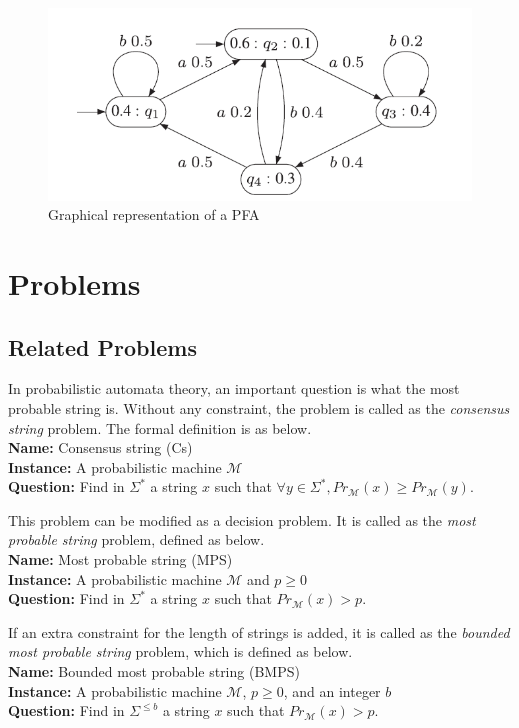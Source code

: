 \documentclass[a4paper]{article}
\begin{document}
\begin{figure}[htbp]
\begin{center}
\includegraphics[scale=0.7]{figure1}
\caption{Graphical representation of a PFA \cite{de2010grammatical}} \label{fig:label}
\end{center}
\end{figure}



\section{Problems}
\subsection{Related Problems}
In probabilistic automata theory, an important question is what the most probable string is. Without any constraint, the problem is called as the \textit{consensus string} problem. The formal definition is as below.\\
\textbf{Name:} Consensus string (Cs) \\
\textbf{Instance:} A probabilistic machine $\mathcal{M}$ \\
\textbf{Question:} Find in $\Sigma^{*}$ a string $x$ such that $\forall y\in \Sigma^{*}, {Pr}_{\mathcal{M}}(x) \geq {Pr}_{\mathcal{M}}(y)$.
\newline
\par
This problem can be modified as a decision problem. It is called as the \textit{most probable string} problem, defined as below. \\
\textbf{Name:} Most probable string (MPS) \\
\textbf{Instance:} A probabilistic machine $\mathcal{M}$ and $p\geq 0$ \\
\textbf{Question:} Find in $\Sigma^{*}$ a string $x$ such that ${Pr}_{\mathcal{M}}(x) > p$.
\newline
\par
If an extra constraint for the length of strings is added, it is called as the \textit{bounded most probable string} problem, which is defined as below. \\
\textbf{Name:} Bounded most probable string (BMPS)\\
\textbf{Instance:} A probabilistic machine $\mathcal{M}$, $p\geq 0$, and an integer $b$ \\
\textbf{Question:} Find in $\Sigma^{\leq b}$ a string $x$ such that ${Pr}_{\mathcal{M}}(x) > p$.
\par
\end{document}
